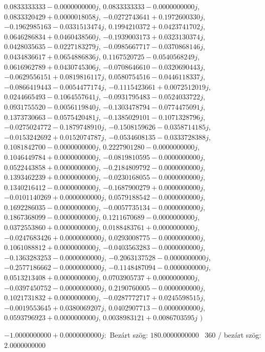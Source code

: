 \documentclass[14pt,a4paper]{article}
\begin{document}
\begin{itemize}
$0.0833333333-0.0000000000j$, $0.0833333333-0.0000000000j$, $0.0833320429+0.0000018058j$, $-0.0272743641+0.1972600330j$, $-0.1962985163-0.0331513474j$, $0.1994210372+0.0423741702j$, $0.0646286834+0.0460438560j$, $-0.1939003173+0.0323130374j$, $0.0428035635-0.0227183279j$, $-0.0985667717-0.0370868146j$, $0.0434836617+0.0654886836j$, $0.1167520725-0.0540568249j$, $0.0616962789+0.0430745306j$, $-0.0708646610-0.0320690443j$, $-0.0629556151+0.0819816117j$, $0.0580754516-0.0446118337j$, $-0.0866419443-0.0054477174j$, $-0.1115423661+0.0072512019j$, $0.0244665493-0.1064557641j$, $-0.0931795483-0.0524033722j$, $0.0931755520-0.0056119840j$, $-0.1303478794-0.0774475091j$, $0.1373730663-0.0575420481j$, $-0.1385029101-0.1071328796j$, $-0.0275024772-0.1879748910j$, $-0.1508159626-0.0358714185j$, $-0.0153242692+0.0152074787j$, $-0.0534608135-0.0333728388j$, $0.1081842700-0.0000000000j$, $0.2227901280-0.0000000000j$, $0.1046449784+0.0000000000j$, $-0.0819810595-0.0000000000j$, $0.0522443858+0.0000000000j$, $-0.2184809792-0.0000000000j$, $0.1393462239+0.0000000000j$, $-0.0230168055-0.0000000000j$, $0.1340216412-0.0000000000j$, $-0.1687900279+0.0000000000j$, $-0.0101140269+0.0000000000j$, $0.0579188542-0.0000000000j$, $0.1692286035-0.0000000000j$, $-0.0057735134-0.0000000000j$, $0.1867368099-0.0000000000j$, $0.1211670689-0.0000000000j$, $0.0372553860+0.0000000000j$, $0.0188483761+0.0000000000j$, $-0.0247683426+0.0000000000j$, $0.0293008775-0.0000000000j$, $0.1061088812+0.0000000000j$, $-0.0403563283-0.0000000000j$, $-0.1363283253-0.0000000000j$, $-0.2063137528-0.0000000000j$, $-0.2577186662-0.0000000000j$, $-0.1148487094-0.0000000000j$, $0.0513213408+0.0000000000j$, $0.0703905737+0.0000000000j$, $-0.0397450752-0.0000000000j$, $0.2190760005-0.0000000000j$, $0.1021731832+0.0000000000j$, $-0.0287772717+0.0245598515j$, $-0.0019553645+0.0380069207j$, $0.0402907713-0.0000000000j$, $0.0593796923+0.0000000000j$, $0.0038983121+0.0086703595j$
$\big)$
\end{itemize}
$-1.0000000000+0.0000000000j$:\
Bezárt szög: $180.0000000000$ \
360 / bezárt szög: $2.0000000000$\
\end{document}
